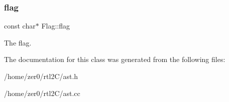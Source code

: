 \subsubsection{\texorpdfstring{flag}{flag}}
{\footnotesize\ttfamily const char$\ast$ Flag\+::flag\hspace{0.3cm}{\ttfamily [protected]}}

The flag. 

The documentation for this class was generated from the following files\+:\begin{DoxyCompactItemize}
\item 
/home/zer0/rtl2\+C/ast.\+h\item 
/home/zer0/rtl2\+C/ast.\+cc\end{DoxyCompactItemize}
